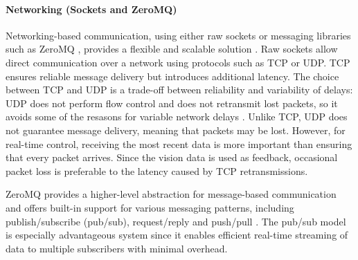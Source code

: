 \paragraph*{Networking (Sockets and ZeroMQ)}
Networking-based communication, using either raw sockets or messaging libraries such as ZeroMQ \cite{noauthor_zeromq_nodate}, provides a flexible and scalable solution \cite{lauener_how_2018}. Raw sockets allow direct communication over a network using protocols such as TCP or UDP. TCP ensures reliable message delivery but introduces additional latency. The choice between TCP and UDP is a trade-off between reliability and variability of delays: UDP does not perform flow control and does not retransmit lost packets, so it avoids some of the resasons for variable network delays \cite{kleppmann_designing_2017}. Unlike TCP, UDP does not guarantee message delivery, meaning that packets may be lost.  However, for real-time control, receiving the most recent data is more important than ensuring that every packet arrives. Since the vision data is used as feedback, occasional packet loss is preferable to the latency caused by TCP retransmissions. 

ZeroMQ provides a higher-level abstraction for message-based communication and offers built-in support for various messaging patterns, including publish/subscribe (pub/sub), request/reply and push/pull \cite{lauener_how_2018}. The pub/sub model is especially advantageous system since it enables efficient real-time streaming of data to multiple subscribers with minimal overhead. 


